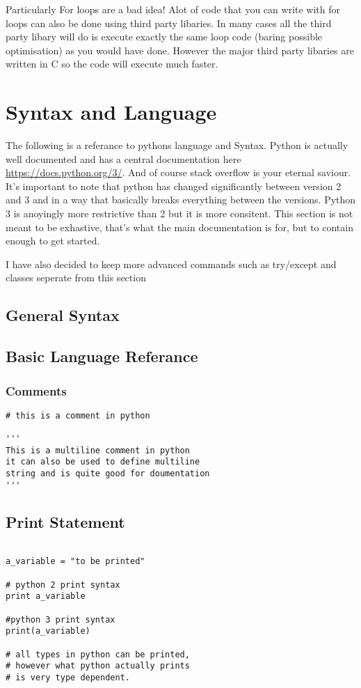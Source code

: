 \documentclass[11pt,a4paper]{article}
\begin{document}
Particularly For loops are a bad idea! Alot of code that you can write with for loops can also be done using third party libaries. In many cases all the third party libary will do is execute exactly the same loop code (baring possible optimisation) as you would have done. However the major third party libaries are written in C so the code will execute much faster.

\section{Syntax and Language}

The following is a referance to pythons language and Syntax. Python is actually well documented and has a central documentation here \url{https://docs.python.org/3/}. And of course stack overflow is your eternal saviour. It's important to note that python has changed significantly between version 2 and 3 and in a way that basically breaks everything between the versions. Python 3 is anoyingly more restrictive than 2 but it is more consitent. This section is not meant to be exhastive, that's what the main documentation is for, but to contain enough to get started. 

I have also decided to keep more advanced commands such as try/except and classes seperate from this section

\subsection{General Syntax}

\subsection{Basic Language Referance}

\subsubsection{Comments}
\begin{verbatim}
# this is a comment in python

'''
This is a multiline comment in python
it can also be used to define multiline
string and is quite good for doumentation
'''

\end{verbatim}

\subsection{Print Statement}
\begin{verbatim}

a_variable = "to be printed"

# python 2 print syntax
print a_variable

#python 3 print syntax
print(a_variable)

# all types in python can be printed,
# however what python actually prints
# is very type dependent.

\end{verbatim}
\end{document}
